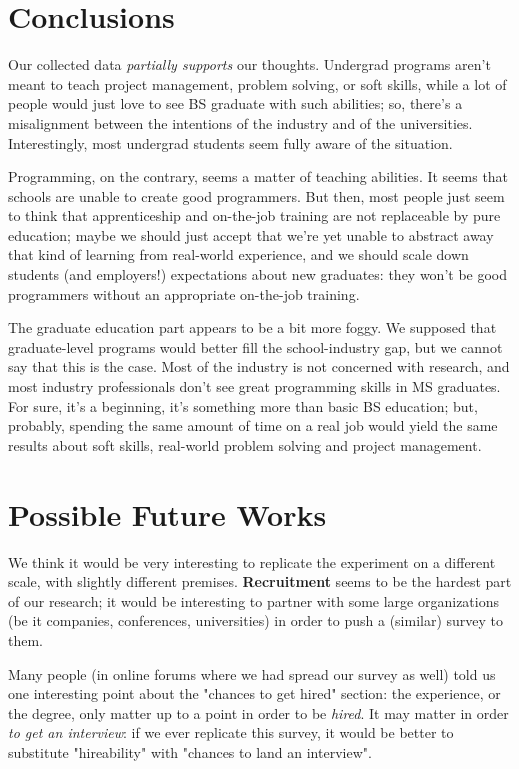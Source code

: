 \documentclass{sigchi}
\begin{document}
\section{Conclusions}
Our collected data \textit{partially supports} our thoughts. Undergrad programs aren't meant to teach project management, problem solving, or soft skills, while a lot of people would just love to see BS graduate with such abilities; so, there's a misalignment between the intentions of the industry and of the universities. Interestingly, most undergrad students seem fully aware of the situation.

Programming, on the contrary, seems a matter of teaching abilities. It seems that schools are unable to create good programmers. But then, most people just seem to think that apprenticeship and on-the-job training are not replaceable by pure education; maybe we should just accept that we're yet unable to abstract away that kind of learning from real-world experience, and we should scale down students (and employers!) expectations about new graduates: they won't be good programmers without an appropriate on-the-job training.

The graduate education part appears to be a bit more foggy. We supposed that graduate-level programs would better fill the school-industry gap, but we cannot say that this is the case. Most of the industry is not concerned with research, and most industry professionals don't see great programming skills in MS graduates. For sure, it's a beginning, it's something more than basic BS education; but, probably, spending the same amount of time on a real job would yield the same results about soft skills, real-world problem solving and project management.

\section{Possible Future Works}
We think it would be very interesting to replicate the experiment on a different scale, with slightly different premises. \textbf{Recruitment} seems to be the hardest part of our research; it would be interesting to partner with some large organizations (be it companies, conferences, universities) in order to push a (similar) survey to them.

Many people (in online forums where we had spread our survey as well) told us one interesting point about the "chances to get hired" section: the experience, or the degree, only matter up to a point in order to be \textit{hired}. It may matter in order \textit{to get an interview}: if we ever replicate this survey, it would be better to substitute "hireability" with "chances to land an interview".
\end{document}
